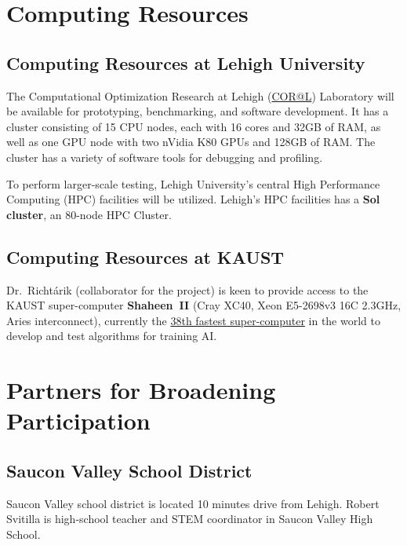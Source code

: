 \documentclass[11pt]{SelfArx}
\begin{document}
\section*{Computing Resources}
  
\subsection*{Computing Resources at Lehigh University}
 
The Computational Optimization Research at Lehigh (\href{http://coral.ise.lehigh.edu}{COR@L}) Laboratory will be available for prototyping, benchmarking, and software development.  It has a cluster consisting of 15 CPU nodes, each with 16 cores and 32GB of RAM, as well as one GPU node with two nVidia K80 GPUs and 128GB of RAM.  The cluster has a variety of software tools for debugging and profiling.

To perform larger-scale testing, Lehigh University's central High Performance Computing (HPC) facilities will be utilized.  Lehigh's HPC facilities has a 
{\bf Sol cluster}, an 80-node HPC Cluster. 

 
\subsection*{Computing Resources at KAUST}
Dr.~Richt\'arik (collaborator for the project)
is keen to provide access to the KAUST super-computer {\bf Shaheen~II} (Cray XC40, Xeon E5-2698v3 16C 2.3GHz, Aries interconnect), currently the \href{https://www.top500.org/site/50205}{38th fastest super-computer} in the world to develop and test algorithms for training AI.
 

 

\section*{Partners for Broadening Participation}




\subsection*{Saucon Valley School District}
 
Saucon Valley school district is located 10 minutes drive from Lehigh. Robert Svitilla is high-school teacher and STEM coordinator in Saucon Valley High School.
 
\end{document}
